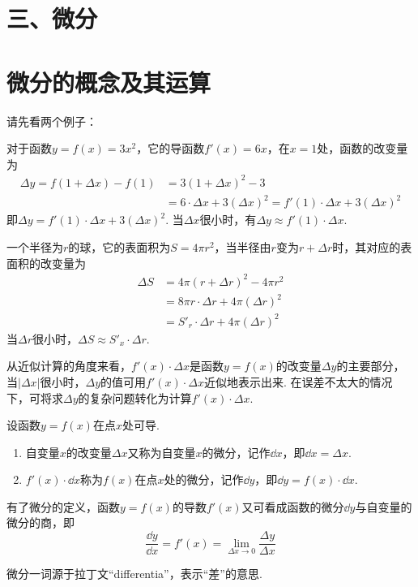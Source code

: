 \section*{三、微分}

\section{微分的概念及其运算}
请先看两个例子：

对于函数$y=f(x)=3x^2$，它的导函数$f'(x)=6x$，在$x=1$处，函数的改变量为
\[\begin{split}
   \Delta y=f(1+\Delta x)-f(1)
&=3(1+\Delta x)^2-3\\
&=6\cdot \Delta x+3(\Delta x)^2=f'(1)\cdot \Delta x+3(\Delta x)^2 
\end{split}\]
即$\Delta y=f'(1)\cdot \Delta x+3(\Delta x)^2$. 当$\Delta x$很小时，有$\Delta y\approx f'(1)\cdot \Delta x$.

一个半径为$r$的球，它的表面积为$S=4\pi r^2$，当半径由$r$变为$r+\Delta r$时，其对应的表面积的改变量为
\[\begin{split}
\Delta S&=4\pi (r+\Delta r)^2-4\pi r^2\\
&=8\pi r\cdot \Delta r+4\pi (\Delta r)^2\\
&=S'_r\cdot \Delta r+4\pi (\Delta r)^2    
\end{split}\]
当$\Delta r$很小时，$\Delta S\approx S'_x\cdot \Delta r$.

从近似计算的角度来看，$f'(x)\cdot \Delta x$是函数$y=f(x)$的改变量$\Delta y$的主要部分，当$|\Delta x|$很小时，$\Delta y$的值可用$f'(x)\cdot \Delta x$近似地表示出来. 在误差不太大的情况下，可将求$\Delta y$的复杂问题转化为计算$f'(x)\cdot \Delta x$.

设函数$y=f(x)$在点$x$处可导.
\begin{enumerate}
    \item 自变量$x$的改变量$\Delta x$又称为自变量$x$的微分，记作$\dd x$，即$\dd x=\Delta x$.
    \item $f'(x)\cdot \dd x$称为$f(x)$在点$x$处的微分，记作$\dd y$，即$\dd y=f(x)\cdot \dd x$.
\end{enumerate}

    有了微分的定义，函数$y=f(x)$的导数$f'(x)$又可看成函数的微分$\dd y$与自变量的微分的商，即
\[\frac{\dd y}{\dd x}=f'(x)=\lim_{\Delta x\to 0}\frac{\Delta y}{\Delta x}\]

\begin{rmk}
    微分一词源于拉丁文“differentia”，表示“差”的意思.
\end{rmk}


